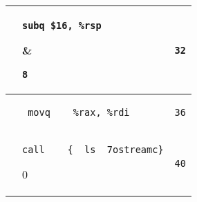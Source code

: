 \documentclass{ti2}
\begin{document}
\begin{tabular}{ | l | l | l|}
\begin{lstlisting}
\end{lstlisting} &
\begin{lstlisting}
subq $16, %rsp
\end{lstlisting} &
\begin{lstlisting}
8
\end{lstlisting} \\ \hline
&
\begin{lstlisting}
 movq    %rdi, -8(%rbp)
\end{lstlisting} &
\begin{lstlisting}
12
\end{lstlisting} \\ \hline
&
\begin{lstlisting}
movq    -8(%rbp), %rax 
\end{lstlisting} &
\begin{lstlisting}
16
\end{lstlisting} \\ \hline
&
\begin{lstlisting}
movq    %rax, %rsi
\end{lstlisting} &
\begin{lstlisting}
20
\end{lstlisting} \\ \hline
&
\begin{lstlisting}
leaq    cout(%rip), %rdi
\end{lstlisting} &
\begin{lstlisting}
24
\end{lstlisting} \\ \hline
&
\begin{lstlisting}
 call    {__ls__7ostreamm}
\end{lstlisting} \color{amber} 0&
\begin{lstlisting}
28
\end{lstlisting} \\ \hline
&
\begin{lstlisting}
movl    $32, %esi
\end{lstlisting} &
\begin{lstlisting}
32
\end{lstlisting} \\ \hline
&
\begin{lstlisting}
 movq    %rax, %rdi
\end{lstlisting} &
\begin{lstlisting}
36
\end{lstlisting} \\ \hline
&
\begin{lstlisting}
call    {__ls__7ostreamc}
\end{lstlisting} \color{amber} 0 &
\begin{lstlisting}
40
\end{lstlisting} \\ \hline


\end{tabular}
\end{document}
